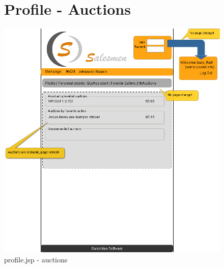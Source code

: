 \documentclass[salesmen, twoside]{../../../templates/latex/2009/softproj}
\begin{document}
\begin{projdoc}
\begin{figure}
\section{Profile - Auctions}
\label{fig_prototype_profile_auctions}
\includegraphics[width=15cm]{../../img/SM_mySM_auctions.png}
\caption{profile.jsp - auctions}
\end{figure}
\begin{figure}

\end{figure}
\end{projdoc}
\end{document}
